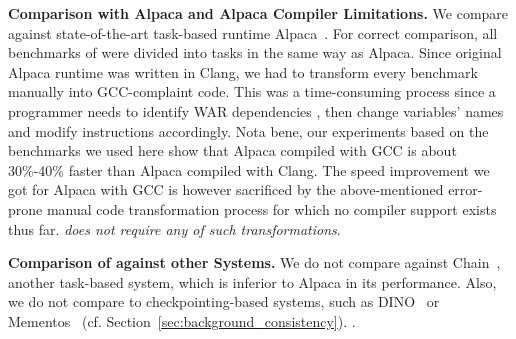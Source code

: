 
\textbf{Comparison with Alpaca and Alpaca Compiler Limitations.} We compare \sys against state-of-the-art task-based runtime Alpaca~\cite{alpaca}. For correct comparison, all benchmarks of \sys were divided into tasks in the same way as Alpaca. Since original Alpaca runtime was written in Clang, we had to transform every benchmark manually into GCC-complaint code.  This was a time-consuming process since a programmer needs to identify WAR dependencies , then change variables' names and modify instructions accordingly. Nota bene, our experiments based on the benchmarks we used here show that Alpaca compiled with GCC is about 30\%-40\% faster than Alpaca compiled with Clang.  The speed improvement we got for Alpaca with GCC is however sacrificed by the above-mentioned error-prone manual code transformation process for which no compiler support exists thus far. \sys \emph{does not require any of such transformations}.

\textbf{Comparison of \sys against other Systems.} We do not compare \sys against Chain~\cite{chain}, another task-based system, which is inferior to Alpaca in its performance. Also, we do not compare \sys to checkpointing-based systems, such as DINO~\cite{dino} or Mementos~\cite{mementos} (cf. Section~\ref{sec:background_consistency}). .